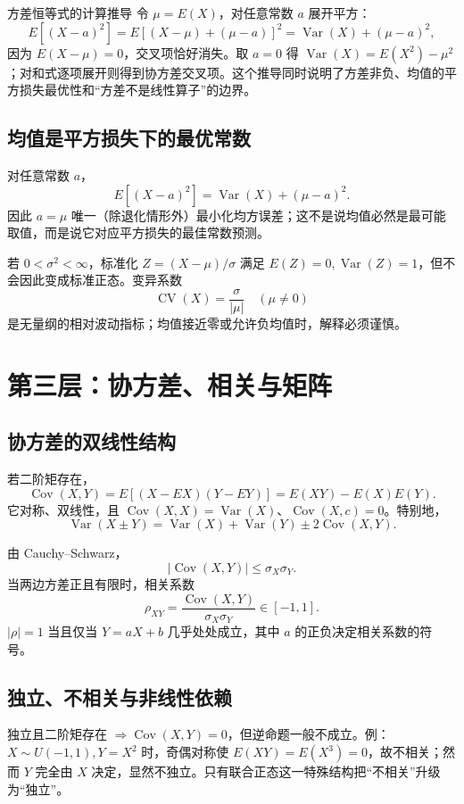 \documentclass[11pt,a4paper]{ctexart}
\begin{document}
\begin{methodbox}{方差恒等式的计算推导}
令 $\mu=E(X)$，对任意常数 $a$ 展开平方：
\[
E[(X-a)^2]
=E[(X-\mu)+(\mu-a)]^2
=\operatorname{Var}(X)+(\mu-a)^2,
\]
因为 $E(X-\mu)=0$，交叉项恰好消失。取 $a=0$ 得
$\operatorname{Var}(X)=E(X^2)-\mu^2$；对和式逐项展开则得到协方差交叉项。这个推导同时说明了方差非负、均值的平方损失最优性和“方差不是线性算子”的边界。
\end{methodbox}

\subsection{均值是平方损失下的最优常数}

对任意常数 $a$，
\[
\boxed{E[(X-a)^2]=\operatorname{Var}(X)+(\mu-a)^2}.
\]
因此 $a=\mu$ 唯一（除退化情形外）最小化均方误差；这不是说均值必然是最可能取值，而是说它对应平方损失的最佳常数预测。

若 $0<\sigma^2<\infty$，标准化 $Z=(X-\mu)/\sigma$ 满足 $E(Z)=0,\operatorname{Var}(Z)=1$，但不会因此变成标准正态。变异系数
\[
\operatorname{CV}(X)=\frac{\sigma}{|\mu|}\quad(\mu\neq0)
\]
是无量纲的相对波动指标；均值接近零或允许负均值时，解释必须谨慎。

\section{第三层：协方差、相关与矩阵}

\subsection{协方差的双线性结构}

若二阶矩存在，
\[
\operatorname{Cov}(X,Y)=E[(X-EX)(Y-EY)]=E(XY)-E(X)E(Y).
\]
它对称、双线性，且 $\operatorname{Cov}(X,X)=\operatorname{Var}(X)$、$\operatorname{Cov}(X,c)=0$。特别地，
\[
\operatorname{Var}(X\pm Y)=\operatorname{Var}(X)+\operatorname{Var}(Y)\pm2\operatorname{Cov}(X,Y).
\]

由 Cauchy--Schwarz，
\[
|\operatorname{Cov}(X,Y)|\leq\sigma_X\sigma_Y.
\]
当两边方差正且有限时，相关系数
\[
\rho_{XY}=\frac{\operatorname{Cov}(X,Y)}{\sigma_X\sigma_Y}\in[-1,1].
\]
$|\rho|=1$ 当且仅当 $Y=aX+b$ 几乎处处成立，其中 $a$ 的正负决定相关系数的符号。

\subsection{独立、不相关与非线性依赖}

独立且二阶矩存在 $\Rightarrow \operatorname{Cov}(X,Y)=0$，但逆命题一般不成立。例：$X\sim U(-1,1),Y=X^2$ 时，奇偶对称使 $E(XY)=E(X^3)=0$，故不相关；然而 $Y$ 完全由 $X$ 决定，显然不独立。只有联合正态这一特殊结构把“不相关”升级为“独立”。
\end{document}
